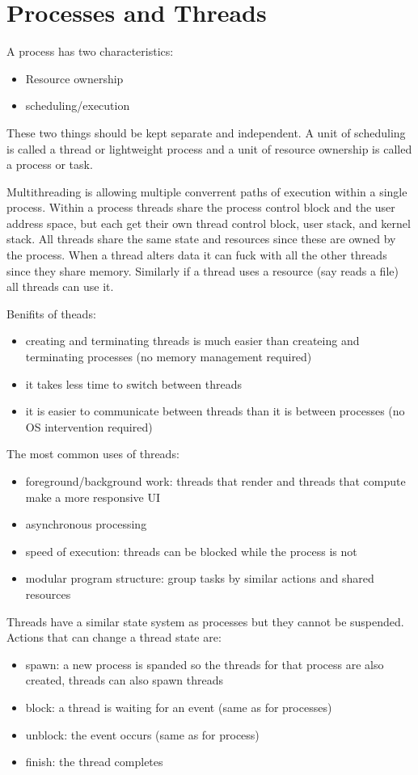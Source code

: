 \documentclass[12pt]{article}
\begin{document}

\section{Processes and Threads}
A process has two characteristics:
\begin{itemize}
    \item Resource ownership
    \item scheduling/execution
\end{itemize}
These two things should be kept separate and independent. A unit of scheduling is called a thread or lightweight process and a unit of resource ownership is called a process or task.

Multithreading is allowing multiple converrent paths of execution within a single process. Within a process threads share the process control block and the user address space, but each get their own thread control block, user stack, and kernel stack. All threads share the same state and resources since these are owned by the process. When a thread alters data it can fuck with all the other threads since they share memory. Similarly if a thread uses a resource (say reads a file) all threads can use it.

Benifits of theads:
\begin{itemize}
    \item creating and terminating threads is much easier than createing and terminating processes (no memory management required)
    \item it takes less time to switch between threads
    \item it is easier to communicate between threads than it is between processes (no OS intervention required)
\end{itemize}

The most common uses of threads:
\begin{itemize}
    \item foreground/background work: threads that render and threads that compute make a more responsive UI
    \item asynchronous processing
    \item speed of execution: threads can be blocked while the process is not
    \item modular program structure: group tasks by similar actions and shared resources
\end{itemize}

Threads have a similar state system as processes but they cannot be suspended. Actions that can change a thread state are:
\begin{itemize}
    \item spawn: a new process is spanded so the threads for that process are also created, threads can also spawn threads
    \item block: a thread is waiting for an event (same as for processes)
    \item unblock: the event occurs (same as for process)
    \item finish: the thread completes
\end{itemize}
\end{document}
